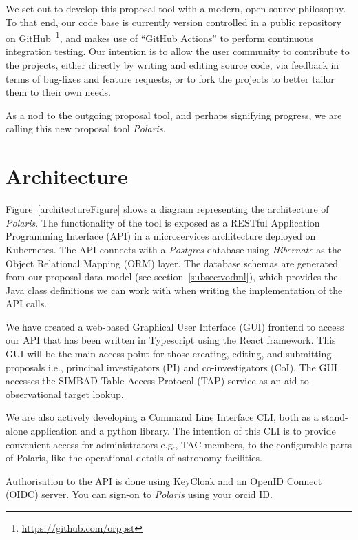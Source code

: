 \documentclass[11pt,twoside]{article}
\begin{document}
We set out to develop this proposal tool with a modern, open source philosophy.
To that end, our code base is currently version controlled in a public repository on
GitHub~\footnote{\url{https://github.com/orppst}}, and makes use of ``GitHub Actions'' to perform continuous
integration testing.
Our intention is to allow the user community to contribute to the projects, either directly by writing and
editing source code, via feedback in terms of bug-fixes and feature requests, or to fork the projects to
better tailor them to their own needs.

As a nod to the outgoing proposal tool, and perhaps signifying progress, we are calling this new proposal tool
\emph{Polaris}.

\section{Architecture}\label{sec:architecture}

Figure~\ref{architectureFigure} shows a diagram representing the architecture of \emph{Polaris}.
The functionality of the tool is exposed as a RESTful Application Programming Interface (API) in a
microservices architecture deployed on Kubernetes.
The API connects with a \emph{Postgres} database using \emph{Hibernate} as the Object Relational Mapping (ORM) layer.
The database schemas are generated from our proposal data model (see section~\ref{subsec:vodml}), which provides
the Java class definitions we can work with when writing the implementation of the API calls.


We have created a web-based Graphical User Interface (GUI) frontend to access our API that has been
written in Typescript using the React framework.
This GUI will be the main access point for those creating, editing, and submitting proposals i.e.,
principal investigators (PI) and co-investigators (CoI).
The GUI accesses the SIMBAD Table Access Protocol (TAP) service as an aid to observational target lookup.

We are also actively developing a Command Line Interface CLI, both as a stand-alone application and
a python library.
The intention of this CLI is to provide convenient access for administrators e.g., TAC members, to
the configurable parts of Polaris, like the operational details of astronomy facilities.

Authorisation to the API is done using KeyCloak and an OpenID Connect (OIDC) server.
You can sign-on to \emph{Polaris} using your orcid ID\@.
\end{document}
